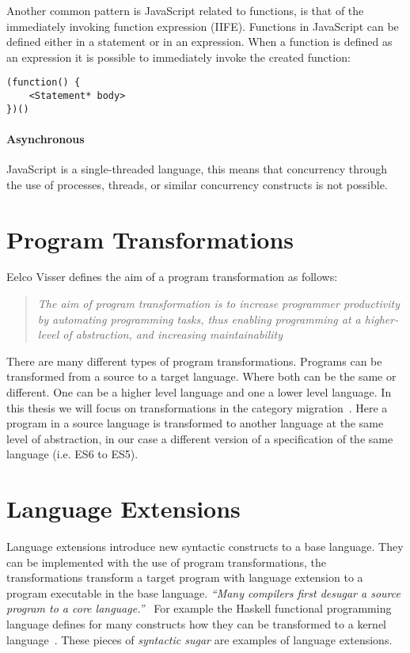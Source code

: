 Another common pattern is JavaScript related to functions, is that of the immediately invoking function expression (IIFE). Functions in JavaScript can be defined either in a statement or in an expression. When a function is defined as an expression it is possible to immediately invoke the created function:

\begin{lstlisting}[title=IIFE,caption={Immediately invoking function expression}]
(function() {
	<Statement* body>
})()
\end{lstlisting}

\paragraph{Asynchronous}
JavaScript is a single-threaded language, this means that concurrency through the use of processes, threads, or similar concurrency constructs is not possible.

\section{Program Transformations}
Eelco Visser defines the aim of a program transformation as follows:

\blockquote[\cite{Visser2001}]{\textit{The aim of program transformation is to increase programmer productivity by automating programming tasks, thus enabling programming at a higher-level of abstraction, and increasing maintainability}}

There are many different types of program transformations. Programs can be transformed from a source to a target language. Where both can be the same or different. One can be a higher level language and one a lower level language. In this thesis we will focus on transformations in the category migration~\cite{Visser2001}. Here a program in a source language is transformed to another language at the same level of abstraction, in our case a different version of a specification of the same language (i.e. ES6 to ES5).

\section{Language Extensions} \label{lang-ext}
Language extensions introduce new syntactic constructs to a base language. They can be implemented with the use of program transformations, the transformations transform a target program with language extension to a program executable in the base language. \textit{``Many compilers first desugar a source program to a core language.''}~\cite{Erdweg2014} For example the Haskell functional programming language defines for many constructs how they can be transformed to a kernel language~\cite{PeytonJones}. These pieces of \textit{syntactic sugar} are examples of language extensions.

